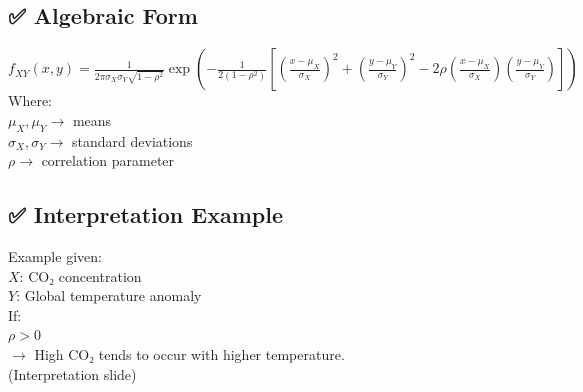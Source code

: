 \documentclass{article}
\begin{document}
\subsection{✅ Algebraic Form}
$f_{XY}(x,y)= \frac{1}{2\pi\sigma_X\sigma_Y\sqrt{1-\rho^2}} \exp\left( -\frac{1}{2(1-\rho^2)} \left[ \left(\frac{x-\mu_X}{\sigma_X}\right)^2 +\left(\frac{y-\mu_Y}{\sigma_Y}\right)^2 -2\rho\left(\frac{x-\mu_X}{\sigma_X}\right) \left(\frac{y-\mu_Y}{\sigma_Y}\right) \right] \right)$ \\
Where: \\
$\mu_X,\mu_Y \rightarrow$ means \\
$\sigma_X,\sigma_Y \rightarrow$ standard deviations \\
$\rho \rightarrow$ correlation parameter

\subsection{✅ Interpretation Example}
Example given: \\
$X$: CO₂ concentration \\
$Y$: Global temperature anomaly \\
If: \\
$\rho>0$ \\
$\rightarrow$ High CO₂ tends to occur with higher temperature. \\
(Interpretation slide)
\end{document}
